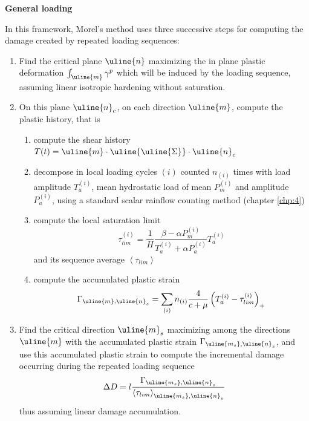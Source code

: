 \vspace{6pt}
\textbf{General loading}
\vspace{6pt}

 In this framework, Morel's method uses three successive steps for computing the damage created by repeated loading sequences:

\begin{enumerate}
\item Find the critical plane $\uline{n}$ maximizing the in plane plastic deformation $\int_{\uline{m}}\gamma^p$ which will be induced by the loading sequence, assuming linear isotropic hardening without saturation.
\item On this plane  $\uline{n}_c$, on each direction $\uline{m}$, compute the plastic history, that is
\begin{enumerate}
	\item compute the shear history $T(t)=\uline{m}\cdot \uline{\uline{\Sigma}}\cdot \uline{n}_c$
	\item decompose in local loading cycles $(i)$ counted $n_{(i)}$ times with load amplitude $T_a^{(i)}$, mean hydrostatic load of mean $P_m^{(i)}$ and amplitude $P_a^{(i)}$, using a standard scalar rainflow counting method (chapter \ref{chp:4})
	\item compute the local saturation limit $$\tau_{lim}^{(i)}=\frac{1}{H}\frac{\beta-\alpha P_m^{(i)}}{T_a^{(i)}+\alpha P_a^{(i)}}T_a^{(i)}$$ and its sequence average $\left\langle \tau_{lim} \right\rangle$ 
	\item compute the accumulated plastic strain 
	\begin{equation}
\Gamma_{\uline{m},\uline{n}_s}=\sum_{(i)}n_{(i)}\dfrac{4}{c+\mu}\left(T_a^{(i)}-\tau_{lim}^{(i)} \right)_+
\label{eq.morel_plastic}
	\end{equation}
\end{enumerate}
\item Find the critical direction $\uline{m}_s$ maximizing among the directions $\uline{m}$ with the accumulated plastic strain $\Gamma_{\uline{m_s},\uline{n}_s}$, and use this accumulated plastic strain to compute the incremental damage occurring during the repeated loading sequence
\begin{equation}\Delta D=l\dfrac{\Gamma_{\uline{m_s},\uline{n}_s}}{\left\langle \tau_{lim} \right\rangle_{\uline{m_s},\uline{n}_s}}
	\label{NFsimple}
\end{equation}
thus assuming linear damage accumulation.
\end{enumerate}

